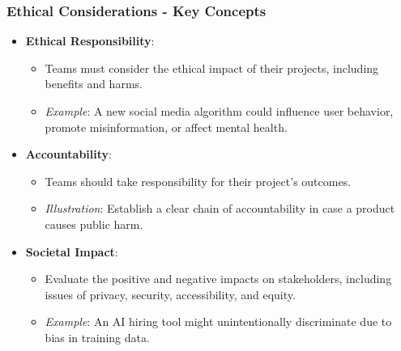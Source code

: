 \documentclass{beamer}
\begin{document}
\begin{frame}[fragile]
    \frametitle{Ethical Considerations - Key Concepts}
    \begin{itemize}
        \item \textbf{Ethical Responsibility}:
        \begin{itemize}
            \item Teams must consider the ethical impact of their projects, including benefits and harms.
            \item \textit{Example}: A new social media algorithm could influence user behavior, promote misinformation, or affect mental health.
        \end{itemize}
        
        \item \textbf{Accountability}:
        \begin{itemize}
            \item Teams should take responsibility for their project's outcomes.
            \item \textit{Illustration}: Establish a clear chain of accountability in case a product causes public harm.
        \end{itemize}
        
        \item \textbf{Societal Impact}:
        \begin{itemize}
            \item Evaluate the positive and negative impacts on stakeholders, including issues of privacy, security, accessibility, and equity.
            \item \textit{Example}: An AI hiring tool might unintentionally discriminate due to bias in training data.
        \end{itemize}
    \end{itemize}
\end{frame}
\end{document}
